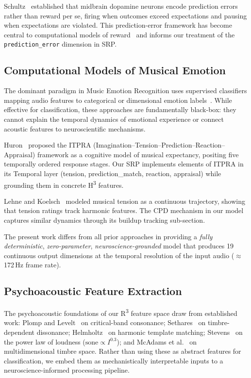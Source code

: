\documentclass[10pt,twocolumn]{article}
\newcommand{\Rtri}{R\textsuperscript{3}}
\newcommand{\Htri}{H\textsuperscript{3}}
\begin{document}
Schultz~\cite{Schultz1997} established that midbrain dopamine neurons encode prediction errors rather than reward per se, firing when outcomes exceed expectations and pausing when expectations are violated. This prediction-error framework has become central to computational models of reward~\cite{Niv2009} and informs our treatment of the \texttt{prediction\_error} dimension in SRP.

\subsection{Computational Models of Musical Emotion}

The dominant paradigm in Music Emotion Recognition uses supervised classifiers mapping audio features to categorical or dimensional emotion labels~\cite{Eerola2011,Yang2018}. While effective for classification, these approaches are fundamentally black-box: they cannot explain the temporal dynamics of emotional experience or connect acoustic features to neuroscientific mechanisms.

Huron~\cite{Huron2006} proposed the ITPRA (Imagination--Tension--Prediction--Reaction--Appraisal) framework as a cognitive model of musical expectancy, positing five temporally ordered response stages. Our SRP implements elements of ITPRA in its Temporal layer (tension, prediction\_match, reaction, appraisal) while grounding them in concrete \Htri{} features.

Lehne and Koelsch~\cite{Lehne2015} modeled musical tension as a continuous trajectory, showing that tension ratings track harmonic features. The CPD mechanism in our model captures similar dynamics through its buildup tracking sub-section.

The present work differs from all prior approaches in providing a \textit{fully deterministic}, \textit{zero-parameter}, \textit{neuroscience-grounded} model that produces 19 continuous output dimensions at the temporal resolution of the input audio ($\approx$172\,Hz frame rate).

\subsection{Psychoacoustic Feature Extraction}

The psychoacoustic foundations of our \Rtri{} feature space draw from established work: Plomp and Levelt~\cite{Plomp1965} on critical-band consonance; Sethares~\cite{Sethares1997} on timbre-dependent dissonance; Helmholtz~\cite{Helmholtz1863} on harmonic template matching; Stevens~\cite{Stevens1957} on the power law of loudness ($\text{sone} \propto I^{0.3}$); and McAdams et al.~\cite{McAdams1995} on multidimensional timbre space. Rather than using these as abstract features for classification, we embed them as mechanistically interpretable inputs to a neuroscience-informed processing pipeline.
\end{document}

